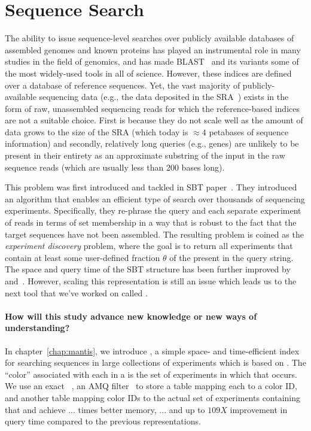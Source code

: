 \section{Sequence Search}
\label{subsec:seqsearch}
The ability to issue sequence-level searches over publicly available databases
of assembled genomes and known proteins has played an instrumental role in many
studies in the field of genomics, and has made BLAST~\citep{Altschul1990BLAST}
and its variants some of the most widely-used tools in all of science.
However, these indices are defined over a database of reference sequences.
Yet, the vast majority of
publicly-available sequencing data (e.g., the data deposited in the
SRA~\citep{Kodama2011sequence}) exists in the form of raw, unassembled
sequencing reads for which the reference-based indices are not
a suitable choice. First is because they do not
scale well as the amount of data grows to the size of the  SRA (which today is
$\approx 4$ petabases of sequence information) and secondly, relatively long queries (e.g.,
genes) are unlikely to be present in their entirety as an approximate substring
of the input in the raw sequence reads (which are usually less than 200 bases long).

This problem was first introduced and tackled in SBT paper~\citep{Solomon2016Fast}.
They introduced an algorithm that enables an
efficient type of search over thousands of sequencing experiments.
Specifically, they re-phrase the query and each separate experiment of reads
in terms of \kmer set membership in a way
that is robust to the fact that the target sequences have not been assembled.
The resulting problem is coined as the \emph{experiment discovery} problem,
where the goal is to return all experiments that contain at least some
user-defined fraction $\theta$ of the \kmers present in the query string.
The space and query time of the SBT structure has been further improved
by~\cite{Solomon2017Improved} and~\cite{Sun2017Allsome}.
However, scaling this representation is still an issue
which leads us to the next tool that we've worked on called \mantis.

\paragraph*{How will this study advance new knowledge or new ways of understanding?}
In chapter~\ref{chap:mantis}, we introduce \mantis,
a simple space- and time-efficient index for searching sequences in large
collections of experiments which is based on \cdbgs.
The ``color'' associated with each \kmer
in a \cdbg is the set of experiments in which that \kmer occurs. We
use an exact \cqf~\cite{PandeyBeJo17a}, an AMQ filter~\cite{} to store a table mapping each \kmer to a color ID,
and another table mapping color IDs to the actual set of experiments
containing that \kmer and achieve ... times better memory,
... and up to $109X$ improvement in query time compared to the previous representations.

